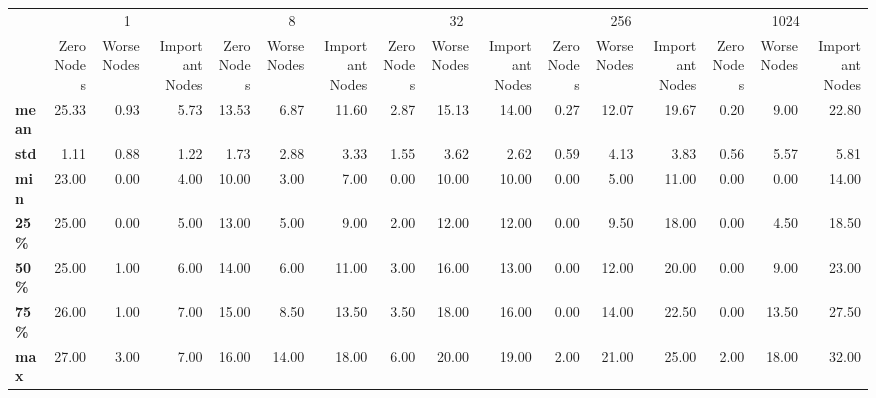 \begin{tabular}{lrrrrrrrrrrrrrrr}
\toprule
{} & \multicolumn{3}{c}{1} & \multicolumn{3}{c}{8} & \multicolumn{3}{c}{32} & \multicolumn{3}{c}{256} & \multicolumn{3}{c}{1024} \\
{} & Zero Nodes & Worse Nodes & Important Nodes & Zero Nodes & Worse Nodes & Important Nodes & Zero Nodes & Worse Nodes & Important Nodes & Zero Nodes & Worse Nodes & Important Nodes & Zero Nodes & Worse Nodes & Important Nodes \\
\midrule
\textbf{mean} &      25.33 &        0.93 &            5.73 &      13.53 &        6.87 &           11.60 &       2.87 &       15.13 &           14.00 &       0.27 &       12.07 &           19.67 &       0.20 &        9.00 &           22.80 \\
\textbf{std } &       1.11 &        0.88 &            1.22 &       1.73 &        2.88 &            3.33 &       1.55 &        3.62 &            2.62 &       0.59 &        4.13 &            3.83 &       0.56 &        5.57 &            5.81 \\
\textbf{min } &      23.00 &        0.00 &            4.00 &      10.00 &        3.00 &            7.00 &       0.00 &       10.00 &           10.00 &       0.00 &        5.00 &           11.00 &       0.00 &        0.00 &           14.00 \\
\textbf{25\% } &      25.00 &        0.00 &            5.00 &      13.00 &        5.00 &            9.00 &       2.00 &       12.00 &           12.00 &       0.00 &        9.50 &           18.00 &       0.00 &        4.50 &           18.50 \\
\textbf{50\% } &      25.00 &        1.00 &            6.00 &      14.00 &        6.00 &           11.00 &       3.00 &       16.00 &           13.00 &       0.00 &       12.00 &           20.00 &       0.00 &        9.00 &           23.00 \\
\textbf{75\% } &      26.00 &        1.00 &            7.00 &      15.00 &        8.50 &           13.50 &       3.50 &       18.00 &           16.00 &       0.00 &       14.00 &           22.50 &       0.00 &       13.50 &           27.50 \\
\textbf{max } &      27.00 &        3.00 &            7.00 &      16.00 &       14.00 &           18.00 &       6.00 &       20.00 &           19.00 &       2.00 &       21.00 &           25.00 &       2.00 &       18.00 &           32.00 \\
\bottomrule
\end{tabular}
